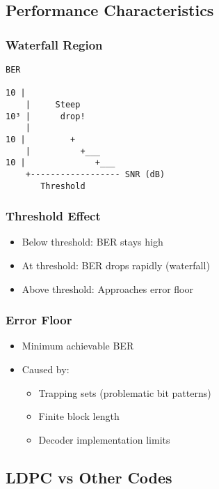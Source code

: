 \subsection{Performance
Characteristics}\label{performance-characteristics}

\subsubsection{Waterfall Region}\label{waterfall-region}

\begin{verbatim}
BER
 
10 |
    |     Steep
10³ |      drop!
    |        
10 |         +
    |          +___
10 |              +___
    +------------------ SNR (dB)
       Threshold
\end{verbatim}

\subsubsection{Threshold Effect}\label{threshold-effect}

\begin{itemize}
\tightlist
\item
  Below threshold: BER stays high
\item
  At threshold: BER drops rapidly (waterfall)
\item
  Above threshold: Approaches error floor
\end{itemize}

\subsubsection{Error Floor}\label{error-floor}

\begin{itemize}
\tightlist
\item
  Minimum achievable BER
\item
  Caused by:

  \begin{itemize}
  \tightlist
  \item
    Trapping sets (problematic bit patterns)
  \item
    Finite block length
  \item
    Decoder implementation limits
  \end{itemize}
\end{itemize}

\subsection{LDPC vs Other Codes}\label{ldpc-vs-other-codes}

